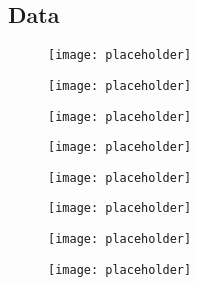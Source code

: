 	\newpage
	\subsection{Data}

	\begin{figure}[h]
		\centering

		\begin{minipage}[h]{0.33\linewidth}
			\texttt{[image: placeholder]}
			\caption{}
			\label{fig:D:leadingbpt}
		\end{minipage}
		\quad
		\begin{minipage}[h]{0.33\linewidth}
			\texttt{[image: placeholder]}
			\caption{}
			\label{fig:D:leadingbptslice}
		\end{minipage}
	\end{figure}

	\begin{figure}[h]
		\centering

		\begin{minipage}[h]{0.33\linewidth}
			\texttt{[image: placeholder]}
			\caption{}
			\label{fig:D:leadingbeta}
		\end{minipage}
		\quad
		\begin{minipage}[h]{0.33\linewidth}
			\texttt{[image: placeholder]}
			\caption{}
			\label{fig:D:leadingbetaslice}
		\end{minipage}
	\end{figure}

	\begin{figure}[h]
		\centering

		\begin{minipage}[h]{0.33\linewidth}
			\texttt{[image: placeholder]}
			\caption{}
			\label{fig:D:leadingbphi}
		\end{minipage}
		\quad
		\begin{minipage}[h]{0.33\linewidth}
			\texttt{[image: placeholder]}
			\caption{}
			\label{fig:D:leadingbphislice}
		\end{minipage}
	\end{figure}

	\begin{figure}[h]
		\centering

		\begin{minipage}[h]{0.33\linewidth}
			\texttt{[image: placeholder]}
			\caption{}
			\label{fig:D:leadingbm}
		\end{minipage}
		\quad
		\begin{minipage}[h]{0.33\linewidth}
			\texttt{[image: placeholder]}
			\caption{}
			\label{fig:D:leadingbmslice}
		\end{minipage}
	\end{figure}

